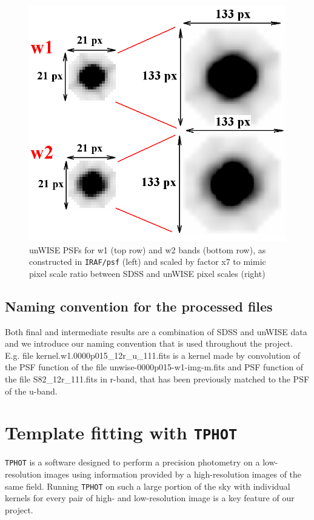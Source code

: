 \begin{figure}[!ht]
\includegraphics[width=6in]{Figures/unwise_psf.png}
\caption{unWISE PSFs for w1 (top row) and w2 bands (bottom row), as constructed in {\tt IRAF/psf} (left) and scaled by factor x7 to mimic pixel scale ratio between SDSS and unWISE pixel scales (right)}
\label{fig:unwise_psf}
\end{figure}

\subsection{Naming convention for the processed files}

Both final and intermediate results are a combination of SDSS and unWISE data and we introduce our naming convention that is used throughout the project. E.g. file
kernel.w1.0000p015\_12r\_u\_111.fits is a kernel made by convolution of the PSF function of the file unwise-0000p015-w1-img-m.fits and PSF function of the file S82\_12r\_111.fits in r-band, that has been previously matched to the PSF of the u-band.


\section{Template fitting with {\tt TPHOT}}
{\tt TPHOT} is a software designed to perform a precision photometry on a low-resolution images using information provided by a high-resolution images of the same field. Running {\tt TPHOT} on such a large portion of the sky with individual kernels for every pair of high- and low-resolution image is a key feature of our project.


